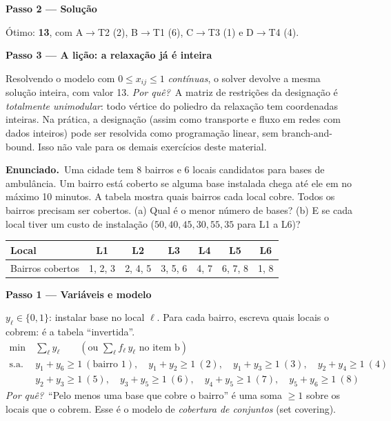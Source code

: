\documentclass[11pt,a4paper]{article}
\newcommand{\enunciado}{\par\textbf{Enunciado.}\ }
\newcommand{\passo}[1]{\par\medskip\textbf{#1}\par}
\newcommand{\porque}{\textit{Por quê?}\ }
\begin{document}
\passo{Passo 2 --- Solução}
Ótimo: \textbf{13}, com A$\to$T2 (2), B$\to$T1 (6), C$\to$T3 (1) e D$\to$T4 (4).

\passo{Passo 3 --- A lição: a relaxação já é inteira}
Resolvendo o modelo com $0\le x_{ij}\le1$ \emph{contínuas}, o solver devolve a mesma solução inteira, com valor 13.
\porque A matriz de restrições da designação é \emph{totalmente unimodular}: todo vértice do poliedro da relaxação tem
coordenadas inteiras. Na prática, a designação (assim como transporte e fluxo em redes com dados inteiros) pode ser
resolvida como programação linear, sem branch-and-bound. Isso não vale para os demais exercícios deste material.

\enunciado Uma cidade tem 8 bairros e 6 locais candidatos para bases de ambulância. Um bairro está coberto se alguma
base instalada chega até ele em no máximo 10 minutos. A tabela mostra quais bairros cada local cobre. Todos os bairros
precisam ser cobertos. (a) Qual é o menor número de bases? (b) E se cada local tiver um custo de instalação
($50, 40, 45, 30, 55, 35$ para L1 a L6)?
\begin{center}
\begin{tabular}{lcccccc}
\toprule
Local & L1 & L2 & L3 & L4 & L5 & L6\\
\midrule
Bairros cobertos & 1, 2, 3 & 2, 4, 5 & 3, 5, 6 & 4, 7 & 6, 7, 8 & 1, 8\\
\bottomrule
\end{tabular}
\end{center}

\passo{Passo 1 --- Variáveis e modelo}
$y_\ell\in\{0,1\}$: instalar base no local $\ell$. Para cada bairro, escreva quais locais o cobrem: é a tabela
``invertida''.
\begin{align*}
  \min\ & \sum_\ell y_\ell \qquad(\text{ou } \textstyle\sum_\ell f_\ell\,y_\ell \text{ no item b})\\
  \text{s.a.}\ & y_1 + y_6 \ge 1 \ (\text{bairro 1}), \quad y_1 + y_2 \ge 1 \ (2), \quad y_1 + y_3 \ge 1 \ (3), \quad y_2 + y_4 \ge 1 \ (4)\\
  & y_2 + y_3 \ge 1 \ (5), \quad y_3 + y_5 \ge 1 \ (6), \quad y_4 + y_5 \ge 1 \ (7), \quad y_5 + y_6 \ge 1 \ (8)
\end{align*}
\porque ``Pelo menos uma base que cobre o bairro'' é uma soma $\ge1$ sobre os locais que o cobrem. Esse é o modelo
de \emph{cobertura de conjuntos} (set covering).
\end{document}
